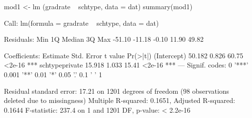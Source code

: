 \begin{Schunk}
\begin{Sinput}
 mod1 <- lm (gradrate ~ schtype, data = dat)
 summary(mod1)
\end{Sinput}
\begin{Soutput}
Call:
lm(formula = gradrate ~ schtype, data = dat)

Residuals:
   Min     1Q Median     3Q    Max 
-51.10 -11.18  -0.10  11.90  49.82 

Coefficients:
               Estimate Std. Error t value Pr(>|t|)    
(Intercept)      50.182      0.826   60.75   <2e-16 ***
schtypeprivate   15.918      1.033   15.41   <2e-16 ***
---
Signif. codes:  0 '***' 0.001 '**' 0.01 '*' 0.05 '.' 0.1 ' ' 1

Residual standard error: 17.21 on 1201 degrees of freedom
  (98 observations deleted due to missingness)
Multiple R-squared:  0.1651,	Adjusted R-squared:  0.1644 
F-statistic: 237.4 on 1 and 1201 DF,  p-value: < 2.2e-16
\end{Soutput}
\end{Schunk}
